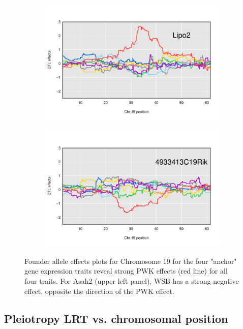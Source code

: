 \documentclass{article}
\begin{document}
\begin{figure}
    \begin{subfigure}[t]{0.5\linewidth}
        \includegraphics[width = \linewidth]{../Rmd/allele_effects_Lipo2.pdf}
    \end{subfigure}
    \begin{subfigure}[t]{0.5\linewidth}
        \includegraphics[width = \linewidth]{../Rmd/allele_effects_4933413C19Rik.pdf}
    \end{subfigure}
        \caption{Founder allele effects plots for Chromosome 19 for the four "anchor" gene expression traits reveal strong PWK effects (red line) for all four traits. For Asah2 (upper left panel), WSB has a strong negative effect, opposite the direction of the PWK effect.}\label{fig:founder-allele-effects}
\end{figure}




\subsection{Pleiotropy LRT vs. chromosomal position}
\end{document}
